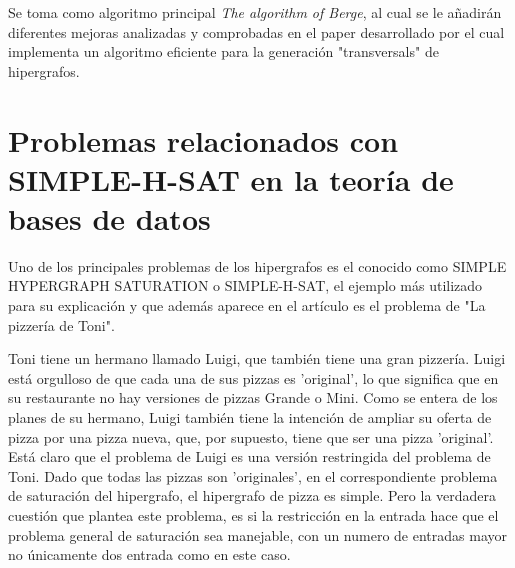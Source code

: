\documentclass{cosas/tfg_domingo}
\begin{document}
Se toma como algoritmo principal \textit{The algorithm of Berge}, al cual se le añadirán diferentes mejoras analizadas y comprobadas en el paper desarrollado por \citep{JGAA-107} el cual implementa un algoritmo eficiente para la generación "transversals" de hipergrafos.


%

\begin{center}








\end{center}
\newpage
\section{Problemas relacionados con SIMPLE-H-SAT en la teoría de bases de datos}

Uno de los principales problemas de los hipergrafos es el conocido como SIMPLE HYPERGRAPH SATURATION o SIMPLE-H-SAT, el ejemplo más utilizado para su explicación y que además aparece en el artículo \citet{Thomas} es el problema de "La pizzería de Toni".

Toni tiene un hermano llamado Luigi, que también tiene una gran pizzería. Luigi está orgulloso de que cada una de sus pizzas es 'original', lo que significa que en su restaurante no hay versiones de pizzas Grande o Mini. Como se entera de los planes de su hermano, Luigi también tiene la intención de ampliar su oferta de pizza por una pizza nueva, que, por supuesto, tiene que ser una pizza 'original'. Está claro que el problema de Luigi es una versión restringida del problema de Toni. Dado que todas las pizzas son 'originales', en el correspondiente problema de saturación del hipergrafo, el hipergrafo de pizza es simple. Pero la verdadera cuestión que plantea este problema, es si la restricción en la entrada hace que el problema general de saturación sea manejable, con un numero de entradas mayor no únicamente dos entrada como en este caso.
\end{document}
